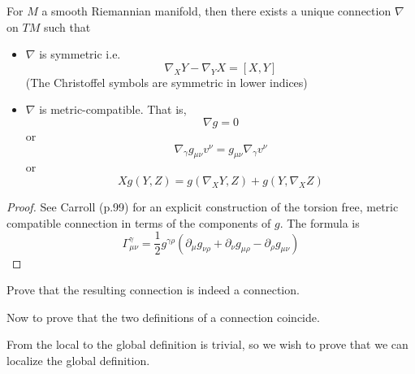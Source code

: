 \documentclass[../main.tex]{subfiles}
\begin{document}
\begin{theorem}
    For $M$ a smooth Riemannian manifold, then there exists a unique connection
    $\nabla$ on $TM$ such that
    \begin{itemize}
        \item $\nabla$ is symmetric i.e.
            \[
                \nabla_XY -\nabla_YX = [X,Y]
            \]
            (The Christoffel symbols are symmetric in lower indices)
        \item $\nabla$ is metric-compatible. That is,
            \[
                \nabla g = 0
            \]
            or
            \[
                \nabla_{\gamma}g_{\mu\nu}v^{\nu} =
                g_{\mu\nu}\nabla_{\gamma}v^{\nu}
            \]
            or
            \[
                Xg(Y,Z) = g(\nabla_XY,Z) + g(Y,\nabla_XZ)
            \]
    \end{itemize}
\end{theorem}
\begin{proof}
    See Carroll (p.99) for an explicit construction of the torsion free, metric
    compatible connection in terms of the components of $g$.
    The formula is
    \[
        \Gamma_{\mu\nu}^{\gamma} = \frac{1}{2}g^{\gamma\rho}
        (\partial_{\mu}g_{\nu\rho} +
        \partial_{\nu}g_{\mu\rho}-\partial_{\rho}g_{\mu\nu})
    \]
\end{proof}
\begin{hw}
    Prove that the resulting connection is indeed a connection.
\end{hw}

Now to prove that the two definitions of a connection coincide.

From the local to the global definition is trivial, so we wish to prove that we
can localize the global definition.
\end{document}
